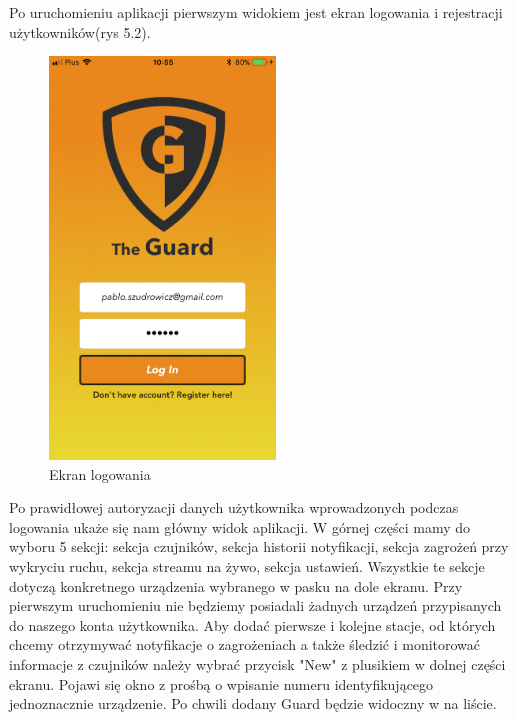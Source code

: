 Po uruchomieniu aplikacji pierwszym widokiem jest ekran logowania i rejestracji użytkowników(rys 5.2). 
\begin{figure}[h]
	\centering
	\includegraphics[width=6cm]{login.png}
	\caption{Ekran logowania}
\end{figure}
Po prawidłowej autoryzacji danych użytkownika wprowadzonych podczas logowania ukaże się nam główny widok aplikacji. W górnej części mamy do wyboru 5 sekcji:
sekcja czujników, sekcja historii notyfikacji, sekcja zagrożeń przy wykryciu ruchu, sekcja streamu na żywo, sekcja ustawień. Wszystkie te sekcje dotyczą konkretnego urządzenia wybranego w pasku na dole ekranu. Przy pierwszym uruchomieniu nie będziemy posiadali żadnych urządzeń przypisanych do naszego konta użytkownika. Aby dodać pierwsze i kolejne stacje, od których chcemy otrzymywać notyfikacje o zagrożeniach a także śledzić i monitorować informacje z czujników należy wybrać przycisk "New" z plusikiem w dolnej części ekranu. Pojawi się okno z prośbą o wpisanie numeru identyfikującego jednoznacznie urządzenie. Po chwili dodany Guard będzie widoczny w na liście.

